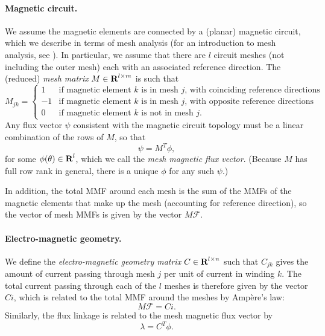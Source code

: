 \documentclass[11pt]{article}
\newcommand{\reals}{{\mbox{\bf R}}}
\begin{document}
\paragraph{Magnetic circuit.}
We assume the magnetic elements are connected by a (planar) magnetic circuit,
which we describe in terms of mesh analysis
(for an introduction to mesh analysis, see \cite{desoer1984basic}).
In particular, we assume that there are $l$ circuit meshes
(not including the outer mesh)
each with an associated reference direction.
The (reduced) \emph{mesh matrix} $M\in \reals^{l \times m}$
is such that 
\[
M_{jk} = 
\begin{cases}
 1 & \text{if magnetic element $k$ is in mesh $j$, with coinciding reference directions} \\
-1 & \text{if magnetic element $k$ is in mesh $j$, with opposite reference directions} \\
 0 & \text{if magnetic element $k$ is not in mesh $j$}.
\end{cases}
\]
Any flux vector $\psi$ consistent with the magnetic circuit topology
must be a linear combination of the rows of $M$, so that
\begin{equation}
\label{e-loop-kcl}
\psi = M^T \phi,
\end{equation}
for some $\phi(\theta) \in \reals^l$,
which we call the \emph{mesh magnetic flux vector}.
(Because $M$ has full row rank in general, 
there is a unique $\phi$ for any such $\psi$.)

In addition, the total MMF around each mesh 
is the sum of the MMFs of the magnetic elements
that make up the mesh (accounting for reference direction),
so the vector of mesh MMFs is given by the vector $M \mathcal F$.

\paragraph{Electro-magnetic geometry.}
We define the \emph{electro-magnetic geometry matrix}
$C \in \reals^{l \times n}$
such that $C_{jk}$ gives the amount of current passing through
mesh $j$ per unit of current in winding $k$.
The total current passing through each of the $l$ meshes is therefore
given by the vector $Ci$,
which is related to the total MMF around the meshes by Amp\`ere's law:
\begin{equation}
\label{e-faraday}
M \mathcal F = Ci.
\end{equation}
Similarly, the flux linkage is related to the mesh magnetic flux vector by
\begin{equation}
\label{e-flux-linkage}
\lambda = C^T \phi.
\end{equation}
\end{document}
